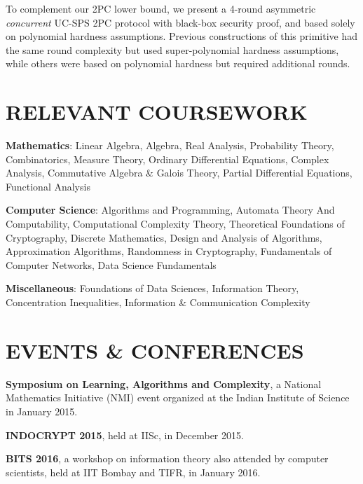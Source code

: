 \documentclass[margin]{res}
\begin{document}
\begin{resume}
\begin{position}
To complement our 2PC lower bound, we present a 4-round asymmetric {\em concurrent} UC-SPS 2PC protocol with black-box security proof, and based solely on polynomial hardness assumptions. Previous constructions of this primitive had the same round complexity but used super-polynomial hardness assumptions, while others were based on polynomial hardness but required additional rounds.  
 
\end{position}




\section{RELEVANT COURSEWORK}
\par
\textbf{Mathematics}:
Linear Algebra, Algebra, Real Analysis, Probability Theory, Combinatorics, Measure Theory, Ordinary Differential Equations, Complex Analysis, Commutative Algebra \& Galois Theory, Partial Differential Equations, Functional Analysis

\par
\textbf{Computer Science}:
Algorithms and Programming, Automata Theory And Computability, Computational Complexity Theory, Theoretical Foundations of Cryptography, Discrete Mathematics, Design and Analysis of Algorithms, Approximation Algorithms, Randomness in Cryptography, Fundamentals of Computer Networks, Data Science Fundamentals

\par
\textbf{Miscellaneous}:
Foundations of Data Sciences, Information Theory, Concentration Inequalities, Information \& Communication Complexity



\iffalse

\section{EVENTS \& CONFERENCES}

\textbf{Symposium on Learning, Algorithms and Complexity}, a National Mathematics Initiative (NMI) event organized at the Indian Institute of Science in January 2015.
\par

\textbf{INDOCRYPT 2015},  held at IISc, in December 2015.

\textbf{BITS 2016}, a workshop on information theory also attended by computer scientists, held at IIT Bombay and TIFR, in January 2016.


\end{resume}
\end{document}
